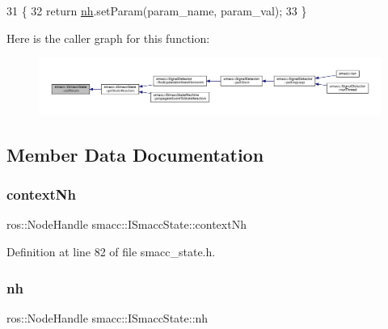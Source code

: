 \begin{DoxyCode}
31 \{
32     \textcolor{keywordflow}{return} \hyperlink{classsmacc_1_1ISmaccState_a13fe6e6abfdb87996402189d44b78494}{nh}.setParam(param\_name, param\_val);
33 \}
\end{DoxyCode}
Here is the caller graph for this function\+:
\nopagebreak
\begin{figure}[H]
\begin{center}
\leavevmode
\includegraphics[width=350pt]{classsmacc_1_1ISmaccState_a0b6c531ca8c446052022308548f55b92_icgraph}
\end{center}
\end{figure}


\subsection{Member Data Documentation}
\mbox{\label{classsmacc_1_1ISmaccState_ae59191a663a08489b7d10036f3b25238}} 
\subsubsection{\texorpdfstring{context\+Nh}{contextNh}}
{\footnotesize\ttfamily ros\+::\+Node\+Handle smacc\+::\+I\+Smacc\+State\+::context\+Nh\hspace{0.3cm}{\ttfamily [protected]}}



Definition at line 82 of file smacc\+\_\+state.\+h.

\mbox{\label{classsmacc_1_1ISmaccState_a13fe6e6abfdb87996402189d44b78494}} 
\subsubsection{\texorpdfstring{nh}{nh}}
{\footnotesize\ttfamily ros\+::\+Node\+Handle smacc\+::\+I\+Smacc\+State\+::nh\hspace{0.3cm}{\ttfamily [protected]}}



